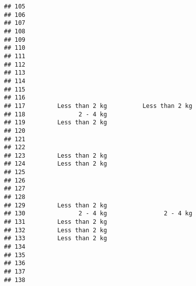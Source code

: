 \documentclass[
]{article}
\begin{document}
\begin{verbatim}
## 105                                                                      
## 106                                                                      
## 107                                                                      
## 108                                                                      
## 109                                                                      
## 110                                                                      
## 111                                                                      
## 112                                                                      
## 113                                                                      
## 114                                                                      
## 115                                                                      
## 116                                                                      
## 117         Less than 2 kg          Less than 2 kg                       
## 118               2 - 4 kg                                               
## 119         Less than 2 kg                                               
## 120                                                                      
## 121                                                                      
## 122                                                                      
## 123         Less than 2 kg                                               
## 124         Less than 2 kg                                               
## 125                                                                      
## 126                                                                      
## 127                                                                      
## 128                                                                      
## 129         Less than 2 kg                                               
## 130               2 - 4 kg                2 - 4 kg                       
## 131         Less than 2 kg                                               
## 132         Less than 2 kg                                               
## 133         Less than 2 kg                                               
## 134                                                                      
## 135                                                                      
## 136                                                                      
## 137                                                                      
## 138                                                                      

\end{verbatim}
\end{document}
